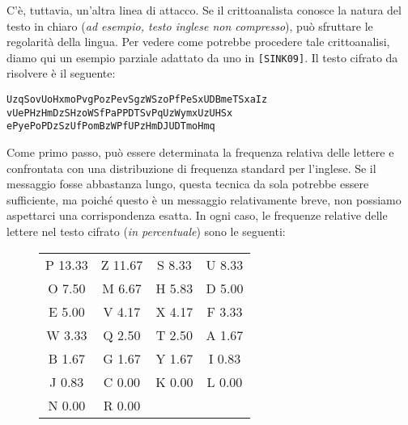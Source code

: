 C'è, tuttavia, un'altra linea di attacco. Se il crittoanalista
conosce la natura del testo in chiaro (\textit{ad esempio, testo inglese
non compresso}), può sfruttare le regolarità della lingua. Per vedere
come potrebbe procedere tale crittoanalisi, diamo qui un esempio
parziale adattato da uno in \verb|[SINK09]|. Il testo cifrato da
risolvere
è il seguente:
\begin{verbatim}
UzqSovUoHxmoPvgPozPevSgzWSzoPfPeSxUDBmeTSxaIz
vUePHzHmDzSHzoWSfPaPPDTSvPqUzWymxUzUHSx
ePyePoPDzSzUfPomBzWPfUPzHmDJUDTmoHmq
\end{verbatim}
Come primo passo, può essere determinata la frequenza relativa delle
lettere e confrontata con una distribuzione di frequenza standard per
l'inglese.
Se il messaggio fosse abbastanza lungo, questa tecnica da sola potrebbe
essere sufficiente, ma poiché questo è un messaggio relativamente breve,
non possiamo aspettarci una corrispondenza esatta. In ogni caso, le
frequenze relative delle lettere nel testo cifrato (\textit{in percentuale}) sono
le seguenti:
\begin{figure}[H]
    \centering
    \begin{tabular}{cccc}
        P 13.33 & Z 11.67 & S 8.33 & U 8.33 \\
        O 7.50 & M 6.67 & H 5.83 & D 5.00 \\
        E 5.00 & V 4.17 & X 4.17 & F 3.33 \\
        W 3.33 & Q 2.50 & T 2.50 & A 1.67 \\
        B 1.67 & G 1.67 & Y 1.67 & I 0.83 \\
        J 0.83 & C 0.00 & K 0.00 & L 0.00 \\
        N 0.00 & R 0.00 &
    \end{tabular}
\end{figure}

